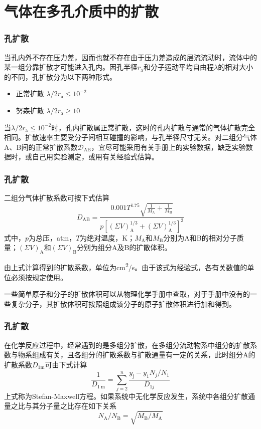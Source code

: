\section{气体在多孔介质中的扩散}


\begin{frame}
    \frametitle{孔扩散}

    当孔内外不存在压力差，因而也就不存在由于压力差造成的层流流动时，流体中的某一组分靠扩散才可能进入孔内。因孔半径$r_\mathrm{a}$和分子运动平均自由程$\lambda$的相对大小的不同，孔扩散分为以下两种形式。
    \begin{itemize}
        \item 正常扩散 \qquad $\lambda /2r_\mathrm{a} \leqslant 10^{-2}$
        \item 努森扩散 \qquad $\lambda /2r_\mathrm{a} \geqslant 10$
    \end{itemize}
    当$\lambda /2r_\mathrm{a} \leqslant 10^{-2}$时，孔内扩散属正常扩散，这时的孔内扩散与通常的气体扩散完全相同。扩散速率主要受分子间相互碰撞的影响，与孔半径尺寸无关。对二组分气体A、B间的正常扩散系数$\mathscr{D}_\mathrm{AB}$，宜尽可能采用有关手册上的实验数据，缺乏实验数据时，或自己用实验测定，或用有关经验式估算。

\end{frame}


\begin{frame}
    \frametitle{孔扩散}

    
二组分气体扩散系数可按下式估算
\[
    D_{\mathrm{AB}}=\frac{0.001 T^{1.75} \sqrt{\frac{1}{M_{\mathrm{A}}}+\frac{1}{M_{\mathrm{B}}}}}{p\left[(\Sigma V)_{\mathrm{A}}^{1 / 3}+(\Sigma V)_{\mathrm{A}}^{1 / 3}\right]^{2}}
\]
式中，$p$为总压，atm，$T$为绝对温度，K；$M_\mathrm{A}$和$M_\mathrm{B}$分别为A和B的相对分子质量；$(\Sigma V)_{\mathrm{A}}$和$(\Sigma V)_{\mathrm{B}}$分别为组分A及B的扩散体积。

由上式计算得到的扩散系数，单位为\si{cm^2/s}。由于该式为经验式，各有关数值的单位必须按规定使用。

一些简单原子和分子的扩散体积可以从物理化学手册中查取，对于手册中没有的一些复杂分子，其扩散体积可按照组成该分子的原子扩散体积进行加和得到。

\end{frame}


\begin{frame}
    \frametitle{孔扩散}

    在化学反应过程中，经常遇到的是多组分扩散，在多组分流动物系中组分的扩散系数与物系组成有关，且各组分的扩散系数与扩散通量有一定的关系，此时组分A的扩散系数$D_\mathrm{1m}$可由下式计算
    \[
        \frac{1}{D_{1 \mathrm{~m}}}=\sum_{j=2}^{n} \frac{y_{\mathrm{j}}-y_{1} N_{j} / N_{1}}{D_{1 j}} 
    \]
    上式称为Stefan-Maxwell方程。如果系统中无化学反应发生，系统中各组分扩散通量之比与其分子量之比存在如下关系
    \[
        N_{\mathrm{A}} / N_{\mathrm{B}}=\sqrt{M_{\mathrm{B}} / M_{\mathrm{A}}} 
    \]

\end{frame}


